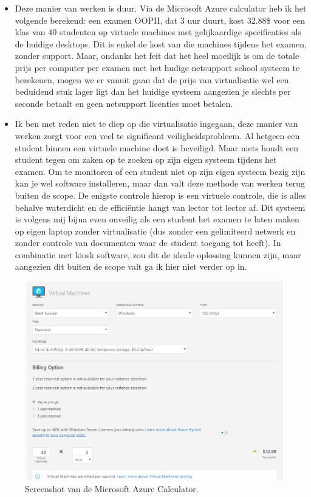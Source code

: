 \begin{itemize}
	\item Deze manier van werken is duur. Via de Microsoft Azure calculator heb ik het volgende berekend: een examen OOPII, dat 3 uur duurt, kost 32.88\$ voor een klas van 40 studenten op virtuele machines met gelijkaardige specificaties als de huidige desktops. Dit is enkel de kost van die machines tijdens het examen, zonder support. Maar, ondanks het feit dat het heel moeilijk is om de totale prijs per computer per examen met het hudige netsupport school systeem te berekenen, mogen we er vanuit gaan dat de prijs van virtualisatie wel een beduidend stuk lager ligt dan het huidige systeem aangezien je slechts per seconde betaalt en geen netsupport licenties moet betalen. 
	
	\item Ik ben met reden niet te diep op die virtualisatie ingegaan, deze manier van werken zorgt voor een veel te significant veiligheidsprobleem. Al hetgeen een student binnen een virtuele machine doet is beveiligd. Maar niets houdt een student tegen om zaken op te zoeken op zijn eigen systeem tijdens het examen. Om te monitoren of een student niet op zijn eigen systeem bezig zijn kan je wel software installeren, maar dan valt deze methode van werken terug buiten de scope. De enigste controle hierop is een virtuele controle, die is alles behalve waterdicht en de effici\"entie hangt van lector tot lector af. Dit systeem is volgens mij bijna even onveilig als een student het examen te laten maken op eigen laptop zonder virtualisatie (dus zonder een gelimiteerd netwerk en zonder controle van documenten waar de student toegang tot heeft).  In combinatie met kiosk software, zou dit de ideale oplossing kunnen zijn, maar aangezien dit buiten de scope valt ga ik hier niet verder op in.
	
\end{itemize}
	
	\begin{figure}
	\includegraphics[width=\linewidth]{img/AzCalc.PNG}
	\caption{Screenshot van de Microsoft Azure Calculator.}
	\label{fig:Calculator1}
\end{figure}


